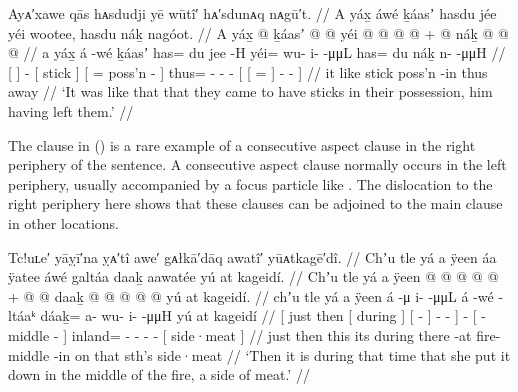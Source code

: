\ex\label{ex:92-126-had-sticks-he-left}%
%
\begingl
	\glpreamble	Ayᴀ′xawe qās hᴀsdudji yē wūtî′ hᴀ′sdunᴀq nᴀgū′t. //
	\glpreamble	A yáx̱ áwé ḵáasʼ hasdu jée yéi wootee, hasdu náḵ nagóot. //
	\gla	{} A yáx̱ {}  @ {}
		{} ḵáasʼ {} {}  @ {}  @ {} {}
		yéi @  @ {} @ {} @ {} +
		{} {}  @ {} náḵ {}
			 @ {} @ {} @ {} {}  //
	\glb	{} a yáx̱ {} á -wé
		{} ḵáasʼ {} {} has= du jee -H {}
		yéi= wu- i-  -μμL
		{} {} has= du náḵ {}
			n-  -μμH {} {} //
	\glc	{}[   {}]  -
		{}[ stick {}] {}[ =  poss’n - {}]
		thus= - -  -
		{}[ {}[ =   {}]
			-  - \· {}] //
	\gld	{} it like {}  {}
		{} stick {} {}  {} poss’n -in {}
		thus  {} {} {}
		{} {}  {} away {}
			 {} {} {} {} //
	\glft	‘It was like that that they came to have sticks in their possession, him having left them.’
		//
\endgl
\xe

The clause  in (\lastx) is a rare example of a consecutive aspect clause in the right periphery of the sentence.
A consecutive aspect clause normally occurs in the left periphery, usually accompanied by a focus particle like .
The dislocation to the right periphery here shows that these clauses can be adjoined to the main clause in other locations.

\ex\label{ex:92-127-put-side-meat-on-fire}%
%
\begingl
	\glpreamble	Tc!uʟe′ yāỵī′na ỵᴀ′tî awe′ gᴀłkā′dāq awatî′ yūᴀtkagē′dî. //
	\glpreamble	Chʼu tle yá a ÿeen áa ÿatee áwé galtáa daaḵ aawatée yú at kageidí. //
	\gla	{} Chʼu tle {} yá a ÿeen {}
			{}  @ {} {}
			 @ {} @ {} @ {} {}
		 @ {} +
		{}  @ {} @ {} {}
		daaḵ @  @ {} @ {} @ {} @ {}
		{} yú at kageidí. {} //
	\glb	{} chʼu tle {} yá a ÿeen {}
			{} á -μ {}
			i-  -μμL {} {}
		á -wé
		{} - ltáaᵏ {} {}
		dáaḵ= a- wu- i-  -μμH
		{} yú at kageidí {} //
	\glc	{}[ just then {}[   during {}]
			{}[  - {}]
			-  -  {}]
		 -
		{}[ - middle - {}]
		inland= - - -  -
		{}[   side·meat {}] //
	\gld	{} just then {} this its during {}
			{} there -at {}
			 {} {} {} {}
		 {}
		{} fire- middle -in {}
		on  {} {} {} {}
		{} that sth’s side·meat {} //
	\glft	‘Then it is during that time that she put it down in the middle of the fire, a side of meat.’
		//
\endgl
\xe

